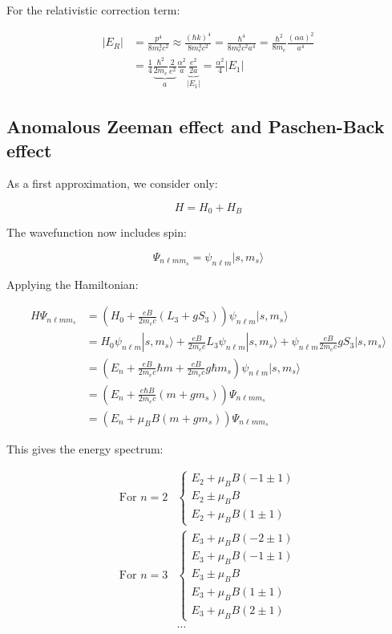 \documentclass[italian]{HKNdocument}
\begin{document}
For the relativistic correction term:

\begin{align}
|E_R| &= \frac{p^4}{8m_e^3c^2} \approx \frac{(\hbar k)^4}{8m_e^3c^2}=\frac{\hbar^4}{8m_e^3c^2a^4}=\frac{\hbar^2}{8m_e}\frac{(\alpha a)^2}{a^4}\\
&= \frac{1}{4}\underbrace{\frac{\hbar^2}{2m_e}\frac{2}{e^2}}_a\frac{\alpha^2}{a}\underbrace{\frac{e^2}{2a}}_{|E_1|}=\frac{\alpha^2}{4}|E_1| \label{eq:12.42}
\end{align}

\subsection{Anomalous Zeeman effect and Paschen-Back effect}
As a first approximation, we consider only:

\begin{equation}
H=H_0+H_B \label{eq:12.43}
\end{equation}

The wavefunction now includes spin:

\begin{equation}
\Psi_{n\ell mm_s}=\psi_{n\ell m}|s,m_s\rangle \label{eq:12.44}
\end{equation}

Applying the Hamiltonian:

\begin{align}
H\Psi_{n\ell mm_s} &= (H_0+\frac{eB}{2m_e c}(L_3+gS_3))\psi_{n\ell m}|s,m_s\rangle\\
&= H_0\psi_{n\ell m}|s,m_s\rangle+\frac{eB}{2m_e c}L_3\psi_{n\ell m}|s,m_s\rangle+\psi_{n\ell m}\frac{eB}{2m_e c}gS_3|s,m_s\rangle\\
&= (E_n+\frac{eB}{2m_e c}\hbar m+\frac{eB}{2m_e c}g\hbar m_s)\psi_{n\ell m}|s,m_s\rangle\\
&= (E_n+\frac{e\hbar B}{2m_e c}(m+gm_s))\Psi_{n\ell mm_s}\\
&= (E_n+\mu_B B(m+gm_s))\Psi_{n\ell mm_s} \label{eq:12.45}
\end{align}

This gives the energy spectrum:

\begin{align}
\text{For } n=2&\left\{\begin{array}{l}
E_2+\mu_B B(-1\pm 1)\\
E_2\pm\mu_B B\\
E_2+\mu_B B(1\pm 1)
\end{array}\right.\\
\text{For } n=3&\left\{\begin{array}{l}
E_3+\mu_B B(-2\pm 1)\\
E_3+\mu_B B(-1\pm 1)\\
E_3\pm\mu_B B\\
E_3+\mu_B B(1\pm 1)\\
E_3+\mu_B B(2\pm 1)
\end{array}\right.\label{eq:12.46}\\
&\ldots
\end{align}
\end{document}
